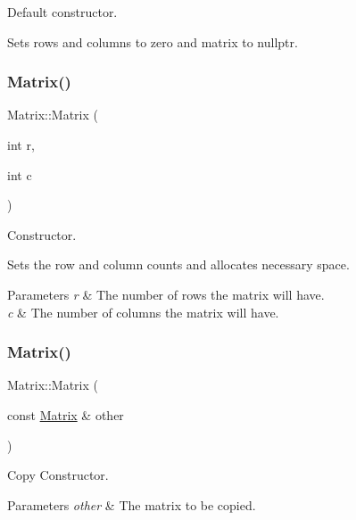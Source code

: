 Default constructor. 

Sets rows and columns to zero and matrix to nullptr. \mbox{\label{classMatrix_adfbeb67cc3c43d96c53f881d79f919cb}} 
\subsubsection{\texorpdfstring{Matrix()}{Matrix()}\hspace{0.1cm}{\footnotesize\ttfamily [2/3]}}
{\footnotesize\ttfamily Matrix\+::\+Matrix (\begin{DoxyParamCaption}\item[{int}]{r,  }\item[{int}]{c }\end{DoxyParamCaption})}



Constructor. 

Sets the row and column counts and allocates necessary space.


\begin{DoxyParams}{Parameters}
{\em r} & The number of rows the matrix will have. \\
\hline
{\em c} & The number of columns the matrix will have. \\
\hline
\end{DoxyParams}
\mbox{\label{classMatrix_a0b9cfa2302a0273afb1b26e501f93abc}} 
\subsubsection{\texorpdfstring{Matrix()}{Matrix()}\hspace{0.1cm}{\footnotesize\ttfamily [3/3]}}
{\footnotesize\ttfamily Matrix\+::\+Matrix (\begin{DoxyParamCaption}\item[{const \hyperlink{classMatrix}{Matrix} \&}]{other }\end{DoxyParamCaption})}



Copy Constructor. 


\begin{DoxyParams}{Parameters}
{\em other} & The matrix to be copied. \\
\hline
\end{DoxyParams}


